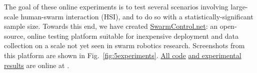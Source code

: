 
The goal of these online experiments is to test several scenarios involving large-scale human-swarm interaction (HSI), and to do so with a statistically-significant sample size. Towards this end, we have created \href{http://www.swarmcontrol.net/show_results}{SwarmControl.net}: an open-source, online testing platform suitable for inexpensive deployment and data collection on a scale not yet seen in swarm robotics research. Screenshots from this platform are shown in Fig.~\ref{fig:5experiments}.  \href{https://github.com/crertel/swarmmanipulate.git}{All code} \href{http://www.swarmcontrol.net/show_results}{and experimental results} are online at \cite{Chris-Ertel2016}.

